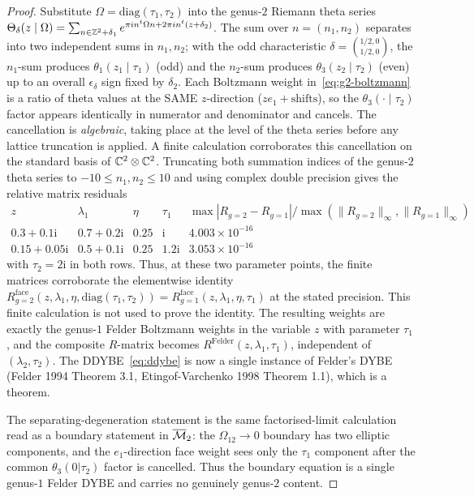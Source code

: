 \begin{proof}
Substitute $\Omega=\mathrm{diag}(\tau_1,\tau_2)$ into the
genus-$2$ Riemann theta series
$\Theta_\delta(z\mid\Omega)=\sum_{n\in\mathbb{Z}^2+\delta_1}
e^{\pi i n^t\Omega n + 2\pi i n^t(z+\delta_2)}$. The sum
over $n=(n_1,n_2)$ separates into two independent sums in
$n_1,n_2$; with the odd characteristic
$\delta=({}^{1/2,0}_{1/2,0})$, the $n_1$-sum produces
$\theta_1(z_1\mid\tau_1)$ (odd) and the $n_2$-sum
produces $\theta_3(z_2\mid\tau_2)$ (even) up to an overall
$\epsilon_\delta$ sign fixed by $\delta_2$. Each Boltzmann
weight in~\eqref{eq:g2-boltzmann} is a ratio of theta values
at the SAME $z$-direction ($z e_1 + \text{shifts}$), so the
$\theta_3(\cdot\mid\tau_2)$ factor appears identically in
numerator and denominator and cancels. The cancellation is
\emph{algebraic}, taking place at the level of the theta series
before any lattice truncation is applied.  A finite calculation
corroborates this cancellation on the standard basis of
$\mathbb{C}^2\otimes\mathbb{C}^2$.  Truncating both summation indices of the
genus-$2$ theta series to $-10\leq n_1,n_2\leq10$ and using
complex double precision gives the relative matrix residuals
\[
\begin{array}{c|c|c|c|c}
z&\lambda_1&\eta&\tau_1&
\max|R_{g=2}-R_{g=1}|/\max(\|R_{g=2}\|_\infty,\|R_{g=1}\|_\infty)\\ \hline
0.3+0.1\mathrm i&0.7+0.2\mathrm i&0.25&\mathrm i&
4.003\times10^{-16}\\
0.15+0.05\mathrm i&0.5+0.1\mathrm i&0.25&1.2\mathrm i&
3.053\times10^{-16}
\end{array}
\]
with $\tau_2=2\mathrm i$ in both rows.  Thus, at these two
parameter points, the finite matrices corroborate the elementwise identity
$R^{\mathrm{face}}_{g=2}(z,\lambda_1,\eta,\mathrm{diag}(\tau_1,\tau_2))
= R^{\mathrm{face}}_{g=1}(z,\lambda_1,\eta,\tau_1)$
at the stated precision.  This finite calculation is not used to
prove the identity. The resulting
weights are exactly the genus-$1$ Felder Boltzmann weights
in the variable $z$ with parameter $\tau_1$, and the
composite $R$-matrix becomes
$R^{\mathrm{Felder}}(z,\lambda_1,\tau_1)$, independent of
$(\lambda_2,\tau_2)$. The DDYBE~\eqref{eq:ddybe} is now a
single instance of Felder's DYBE (Felder 1994 Theorem 3.1,
Etingof-Varchenko 1998 Theorem 1.1), which is a theorem.

The separating-degeneration statement is the same factorised-limit
calculation read as a boundary statement in
$\overline{\mathcal{M}}_2$: the $\Omega_{12}\to0$ boundary has two elliptic
components, and the $e_1$-direction face weight sees only the
$\tau_1$ component after the common $\theta_3(0|\tau_2)$ factor is
cancelled. Thus the boundary equation is a single genus-$1$ Felder
DYBE and carries no genuinely genus-$2$ content.
\end{proof}

